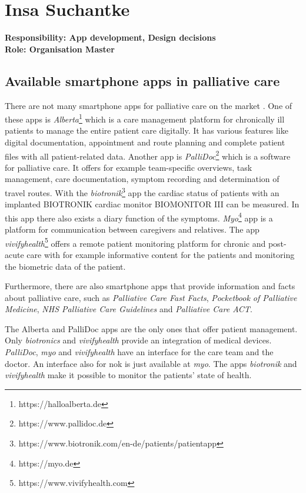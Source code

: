 \section{Insa Suchantke}
\textbf{Responsibility: App development, Design decisions}\\
\textbf{Role: Organisation Master}\\

\subsection{Available smartphone apps in palliative care}
There are not many smartphone apps for palliative care on the market \cite{nwosu}. One of these apps is \textit{Alberta}\footnote{https://halloalberta.de} which is a care management platform for chronically ill patients to manage the entire patient care digitally. It has various features like digital documentation, appointment and route planning and complete patient files with all patient-related data. Another app is \textit{PalliDoc}\footnote{https://www.pallidoc.de} which is a software for palliative care. It offers for example team-specific overviews, task management, care documentation, symptom recording and determination of travel routes.
With the \textit{biotronik}\footnote{https://www.biotronik.com/en-de/patients/patientapp} app the cardiac status of patients with an implanted BIOTRONIK cardiac monitor BIOMONITOR III can be measured. In this app there also exists a diary function of the symptoms. \textit{Myo}\footnote{https://myo.de} app is a platform for communication between caregivers and relatives. The app \textit{vivifyhealth}\footnote{https://www.vivifyhealth.com} offers a remote patient monitoring platform for chronic and post-acute care with for example informative content for the patients and monitoring the biometric data of the patient.

Furthermore, there are also smartphone apps that provide information and facts about palliative care, such as \textit{Palliative Care Fast Facts}, \textit{Pocketbook of Palliative Medicine}, \textit{NHS Palliative Care Guidelines} and \textit{Palliative Care ACT}.

The Alberta and PalliDoc apps are the only ones that offer patient management. Only \textit{biotronics} and \textit{vivifyhealth} provide an integration of medical devices. \textit{PalliDoc}, \textit{myo} and \textit{vivifyhealth} have an interface for the care team and the doctor. An interface also for nok is just available at \textit{myo}. The apps \textit{biotronik} and \textit{vivifyhealth} make it possible to monitor the patients' state of health. 

